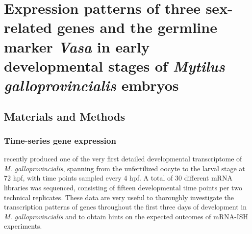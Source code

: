 \documentclass[../main.tex]{subfiles}
\begin{document}
{
\chapter{Expression patterns of three sex-related genes and the germline marker \textit{Vasa} in early developmental stages of \textit{Mytilus galloprovincialis} embryos}
\label{inSitu}


\vspace{5mm}




\vspace{5mm}

}

\vspace{5mm}

\section{Materials and Methods} \label{activities_MM}
\subsection{Time-series gene expression} \label{rnaseq_MM}
\textbf{\cite{miglioli2024hcrMytilus}} recently produced one of the very first detailed developmental transcriptome of \textit{M. galloprovincialis}, spanning from the unfertilized oocyte to the larval stage at 72 hpf, with time points sampled every 4 hpf. A total of 30 different mRNA libraries was sequenced, consisting of fifteen developmental time points per two technical replicates. These data are very useful to thoroughly investigate the transcription patterns of genes throughout the first three days of development in \textit{M. galloprovincialis} and to obtain hints on the expected outcomes of mRNA-ISH experiments.
\end{document}
